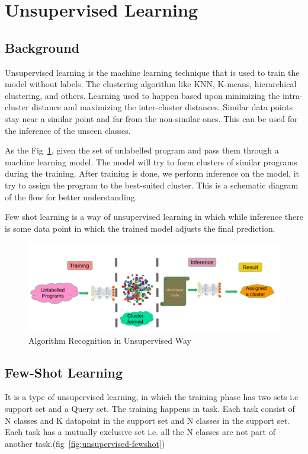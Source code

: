 \section{Unsupervised Learning}


\subsection{Background}
Unsupervised learning is the machine learning technique that is used to train the model without labels. The clustering algorithm like KNN, K-means, hierarchical clustering, and others. 
	Learning used to happen based upon minimizing the intra-cluster distance and maximizing the inter-cluster distances. Similar data points stay near a similar point and far from the non-similar ones. This can be used for the inference of the unseen classes.
	
	As the Fig~\ref{fig:unsupervised-background}, given the set of unlabelled program and pass them through a  machine learning model. The model will try to form clusters of similar programs during the training. After training is done, we perform inference on the model, it try to assign the program to the best-suited cluster. This is a schematic diagram of the flow for better understanding.

	Few shot learning is a way of unsupervised learning in which while inference there is some data point in which the trained model adjusts the final prediction.

\begin{figure}[t]
    \centering
    \includegraphics[scale=0.4]{figures/chapter-3/unsupervised.png}
    \caption{Algorithm Recognition in Unsupervised Way}
     \label{fig:unsupervised-background}
\end{figure}

\subsection{Few-Shot Learning}
	    It is a type of unsupervised learning, in which the training phase has two sets i.e support set and a Query set. The training happens in task. Each task consist of N classes and K datapoint in the support set and N classes in the support set. Each task has a mutually exclusive set i.e. all the N classes are not part of another task.(fig~\ref{fig:unsupervised-fewshot})

